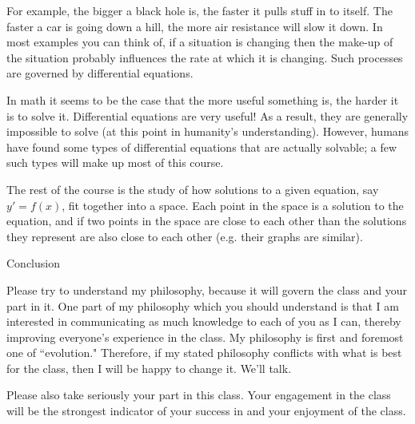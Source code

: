 \documentclass[12pt]{letter}
\begin{document}
For example, the bigger a black hole is, the faster it pulls stuff in to 
itself.  The faster a car is going down a hill, the more air resistance 
will slow it down.  In most examples you can think of, if a situation is 
changing then the make-up of the situation probably influences the rate at 
which it is changing.  Such processes are governed by differential 
equations.

In math it seems to be the case that the more useful something is, the 
harder it is to solve it.  Differential equations are very useful!  As a 
result, they are generally impossible to solve (at this point in 
humanity's understanding).  However, humans have found some types of 
differential equations that are actually solvable; a few such types will 
make up most of this course.

The rest of the course is the study of how solutions to a given equation, 
say $y'=f(x)$, fit together into a space.  Each point in the space is a 
solution to the equation, and if two points in the space are close to 
each other than the solutions they represent are also close to each other 
(e.g. their graphs are similar).

\Large Conclusion\normalsize

Please try to understand my philosophy, because it will govern the class 
and your part in it.  One part of my philosophy which you should 
understand is that I am interested in communicating as much knowledge to 
each of you as I can, thereby improving everyone's experience in the 
class.  My philosophy is first and foremost one of ``evolution."  
Therefore, if my stated philosophy conflicts with what is best for the 
class, then I will be happy to change it.  We'll talk.

Please also take seriously your part in this class.  Your engagement in 
the class will be the strongest indicator of your success in and your 
enjoyment of the class.
\end{document}
